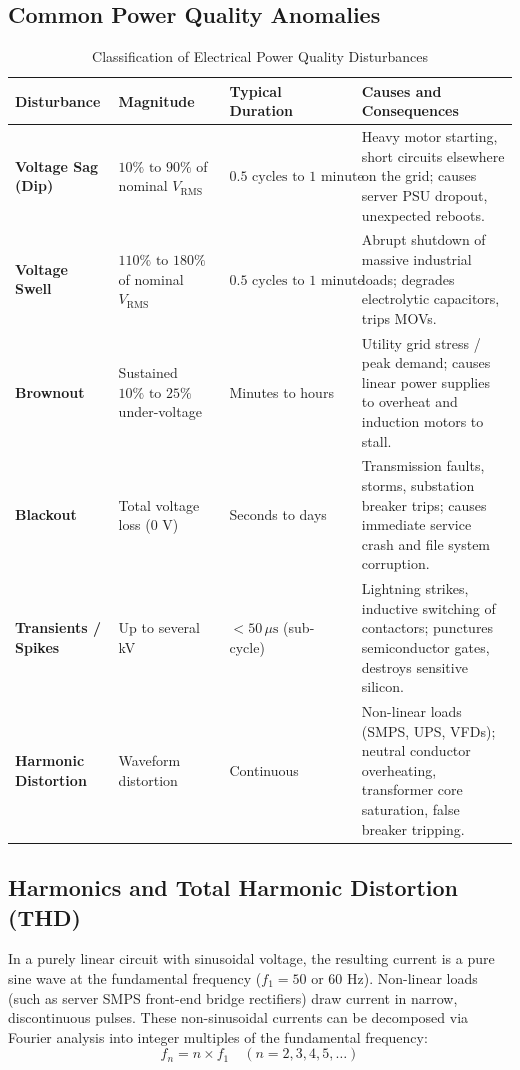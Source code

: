 \subsection{Common Power Quality Anomalies}
\begin{table}[H]
\centering
\small
{}
\begin{tabularx}{\linewidth}{l l l X}
\toprule
\rowcolor{tableheadercolor}
\textbf{Disturbance} & \textbf{Magnitude} & \textbf{Typical Duration} & \textbf{Causes and Consequences} \\
\midrule
\textbf{Voltage Sag (Dip)} & $10\%\text{ to }90\%$ of nominal $V_{\text{RMS}}$ & $0.5\text{ cycles to }1\text{ minute}$ & Heavy motor starting, short circuits elsewhere on the grid; causes server PSU dropout, unexpected reboots. \\
\textbf{Voltage Swell} & $110\%\text{ to }180\%$ of nominal $V_{\text{RMS}}$ & $0.5\text{ cycles to }1\text{ minute}$ & Abrupt shutdown of massive industrial loads; degrades electrolytic capacitors, trips MOVs. \\
\textbf{Brownout} & Sustained $10\%\text{ to }25\%$ under-voltage & Minutes to hours & Utility grid stress / peak demand; causes linear power supplies to overheat and induction motors to stall. \\
\textbf{Blackout} & Total voltage loss ($0\text{ V}$) & Seconds to days & Transmission faults, storms, substation breaker trips; causes immediate service crash and file system corruption. \\
\textbf{Transients / Spikes} & Up to several kV & $<50\,\mu\text{s}$ (sub-cycle) & Lightning strikes, inductive switching of contactors; punctures semiconductor gates, destroys sensitive silicon. \\
\textbf{Harmonic Distortion} & Waveform distortion & Continuous & Non-linear loads (SMPS, UPS, VFDs); neutral conductor overheating, transformer core saturation, false breaker tripping. \\
\bottomrule
\end{tabularx}
\caption{Classification of Electrical Power Quality Disturbances}
\end{table}

\subsection{Harmonics and Total Harmonic Distortion (THD)}
In a purely linear circuit with sinusoidal voltage, the resulting current is a pure sine wave at the fundamental frequency ($f_1 = 50\text{ or }60\text{ Hz}$). Non-linear loads (such as server SMPS front-end bridge rectifiers) draw current in narrow, discontinuous pulses. These non-sinusoidal currents can be decomposed via Fourier analysis into integer multiples of the fundamental frequency:
\[
f_n = n \times f_1 \quad (n = 2, 3, 4, 5, \dots)
\]

